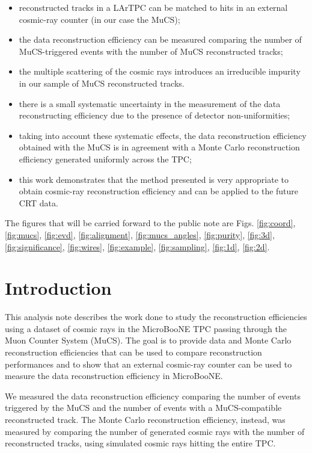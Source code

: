 \documentclass[a4paper]{scrartcl}
\begin{document}
\begin{itemize}
  \item reconstructed tracks in a LArTPC can be matched to hits in an external cosmic-ray counter (in our case the MuCS);
  \item the data reconstruction efficiency can be measured comparing the number of MuCS-triggered events with the number of MuCS reconstructed tracks;
  \item the multiple scattering of the cosmic rays introduces an irreducible impurity in our sample of MuCS reconstructed tracks.
  \item there is a small systematic uncertainty in the measurement of the data reconstructing efficiency due to the presence of detector non-uniformities;
  \item taking into account these systematic effects, the data reconstruction efficiency obtained with the MuCS is in agreement with a Monte Carlo reconstruction efficiency generated uniformly across the TPC;
  \item this work demonstrates that the method presented is very appropriate to obtain cosmic-ray reconstruction efficiency and can be applied to the future CRT data.

\end{itemize}

The figures that will be carried forward to the public note are Figs. \ref{fig:coord}, \ref{fig:mucs}, \ref{fig:evd}, \ref{fig:alignment}, \ref{fig:mucs_angles}, \ref{fig:purity}, \ref{fig:3d}, \ref{fig:significance}, \ref{fig:wires}, \ref{fig:example}, \ref{fig:sampling}, \ref{fig:1d}, \ref{fig:2d}.
\clearpage{}
\section{Introduction}
This analysis note describes the work done to study the reconstruction efficiencies using a dataset of cosmic rays in the MicroBooNE TPC passing through the Muon Counter System (MuCS).
The goal is to provide data and Monte Carlo reconstruction efficiencies that can be used to compare reconstruction performances and to show that an external cosmic-ray counter can be used to measure the data reconstruction efficiency in MicroBooNE.

We measured the data reconstruction efficiency comparing the number of events triggered by the MuCS and the number of events with a MuCS-compatible reconstructed track.
The Monte Carlo reconstruction efficiency, instead, was measured by comparing the number of generated cosmic rays with the number of reconstructed tracks, using simulated cosmic rays hitting the entire TPC.
\end{document}
